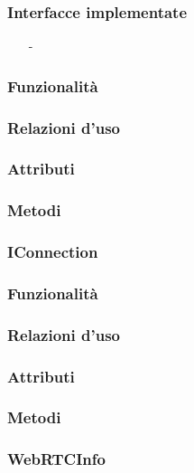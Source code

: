 \subsubsection*{Interfacce implementate}
\begin{itemize}[noitemsep,nolistsep]
  \item[-]
\end{itemize}

\subsubsection*{Funzionalità}

\subsubsection*{Relazioni d'uso}

\subsubsection*{Attributi}

\subsubsection*{Metodi}

\subsubsection{IConnection}\label{sec:iconnection}

\subsubsection*{Funzionalità}

\subsubsection*{Relazioni d'uso}

\subsubsection*{Attributi}

\subsubsection*{Metodi}

\subsubsection{WebRTCInfo}\label{sec:webrtcinfo}

